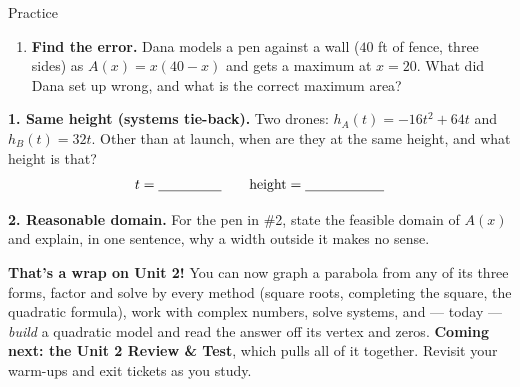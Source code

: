 \documentclass[10pt]{article}
\begin{document}
\begin{notesbox}{Practice}
\begin{enumerate}[leftmargin=1.9em, itemsep=9pt]
  \item \textbf{Find the error.} Dana models a pen against a wall ($40$ ft of fence, three sides) as $A(x)=x(40-x)$
        and gets a maximum at $x=20$. What did Dana set up wrong, and what is the correct maximum area?
        \writeline
\end{enumerate}
\end{notesbox}

\begin{extensionbox}
\textbf{1. Same height (systems tie-back).} Two drones: $h_A(t)=-16t^2+64t$ and $h_B(t)=32t$. Other than at launch,
when are they at the same height, and what height is that?
\[ t=\blank{1.6cm} \qquad \text{height}=\blank{2.0cm} \]

\textbf{2. Reasonable domain.} For the pen in \#2, state the feasible domain of $A(x)$ and explain, in one sentence,
why a width outside it makes no sense. \writeline
\end{extensionbox}

\begin{spiralbox}
\textbf{That's a wrap on Unit 2!} You can now graph a parabola from any of its three forms, factor and solve by every
method (square roots, completing the square, the quadratic formula), work with complex numbers, solve systems, and
--- today --- \emph{build} a quadratic model and read the answer off its vertex and zeros. \textbf{Coming next: the
Unit 2 Review \& Test}, which pulls all of it together. Revisit your warm-ups and exit tickets as you study.
\end{spiralbox}
\end{document}
